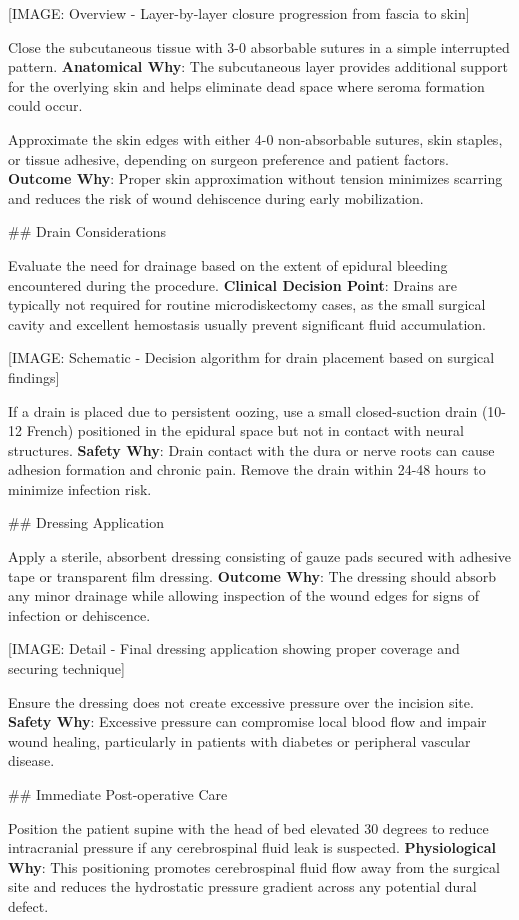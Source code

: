 \documentclass[12pt,a4paper]{article}
\begin{document}
[IMAGE: Overview - Layer-by-layer closure progression from fascia to skin]

Close the subcutaneous tissue with 3-0 absorbable sutures in a simple interrupted pattern. \textbf{Anatomical Why}: The subcutaneous layer provides additional support for the overlying skin and helps eliminate dead space where seroma formation could occur.

Approximate the skin edges with either 4-0 non-absorbable sutures, skin staples, or tissue adhesive, depending on surgeon preference and patient factors. \textbf{Outcome Why}: Proper skin approximation without tension minimizes scarring and reduces the risk of wound dehiscence during early mobilization.

\#\# Drain Considerations

Evaluate the need for drainage based on the extent of epidural bleeding encountered during the procedure. \textbf{Clinical Decision Point}: Drains are typically not required for routine microdiskectomy cases, as the small surgical cavity and excellent hemostasis usually prevent significant fluid accumulation.

[IMAGE: Schematic - Decision algorithm for drain placement based on surgical findings]

If a drain is placed due to persistent oozing, use a small closed-suction drain (10-12 French) positioned in the epidural space but not in contact with neural structures. \textbf{Safety Why}: Drain contact with the dura or nerve roots can cause adhesion formation and chronic pain. Remove the drain within 24-48 hours to minimize infection risk.

\#\# Dressing Application

Apply a sterile, absorbent dressing consisting of gauze pads secured with adhesive tape or transparent film dressing. \textbf{Outcome Why}: The dressing should absorb any minor drainage while allowing inspection of the wound edges for signs of infection or dehiscence.

[IMAGE: Detail - Final dressing application showing proper coverage and securing technique]

Ensure the dressing does not create excessive pressure over the incision site. \textbf{Safety Why}: Excessive pressure can compromise local blood flow and impair wound healing, particularly in patients with diabetes or peripheral vascular disease.

\#\# Immediate Post-operative Care

Position the patient supine with the head of bed elevated 30 degrees to reduce intracranial pressure if any cerebrospinal fluid leak is suspected. \textbf{Physiological Why}: This positioning promotes cerebrospinal fluid flow away from the surgical site and reduces the hydrostatic pressure gradient across any potential dural defect.
\end{document}
